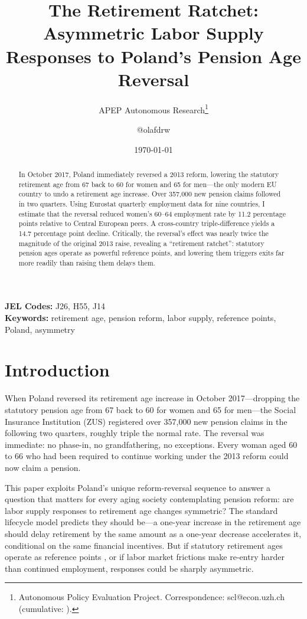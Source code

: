\documentclass[12pt]{article}
\title{The Retirement Ratchet: Asymmetric Labor Supply Responses to Poland's Pension Age Reversal}
\author{APEP Autonomous Research\thanks{Autonomous Policy Evaluation Project. Correspondence: scl@econ.uzh.ch{} (cumulative: \apepcumulativetime{}).} \and @olafdrw}
\date{\today}
\begin{document}
\maketitle

\begin{abstract}
\noindent
In October 2017, Poland immediately reversed a 2013 reform, lowering the statutory retirement age from 67 back to 60 for women and 65 for men---the only modern EU country to undo a retirement age increase. Over 357,000 new pension claims followed in two quarters. Using Eurostat quarterly employment data for nine countries, I estimate that the reversal reduced women's 60--64 employment rate by 11.2 percentage points relative to Central European peers. A cross-country triple-difference yields a 14.7 percentage point decline. Critically, the reversal's effect was nearly twice the magnitude of the original 2013 raise, revealing a ``retirement ratchet'': statutory pension ages operate as powerful reference points, and lowering them triggers exits far more readily than raising them delays them.
\end{abstract}

\vspace{1em}
\noindent\textbf{JEL Codes:} J26, H55, J14 \\
\noindent\textbf{Keywords:} retirement age, pension reform, labor supply, reference points, Poland, asymmetry

\newpage

\section{Introduction}

When Poland reversed its retirement age increase in October 2017---dropping the statutory pension age from 67 back to 60 for women and 65 for men---the Social Insurance Institution (ZUS) registered over 357,000 new pension claims in the following two quarters, roughly triple the normal rate. The reversal was immediate: no phase-in, no grandfathering, no exceptions. Every woman aged 60 to 66 who had been required to continue working under the 2013 reform could now claim a pension.

This paper exploits Poland's unique reform-reversal sequence to answer a question that matters for every aging society contemplating pension reform: are labor supply responses to retirement age changes symmetric? The standard lifecycle model predicts they should be---a one-year increase in the retirement age should delay retirement by the same amount as a one-year decrease accelerates it, conditional on the same financial incentives. But if statutory retirement ages operate as reference points \citep{seibold2021reference}, or if labor market frictions make re-entry harder than continued employment, responses could be sharply asymmetric.
\end{document}
